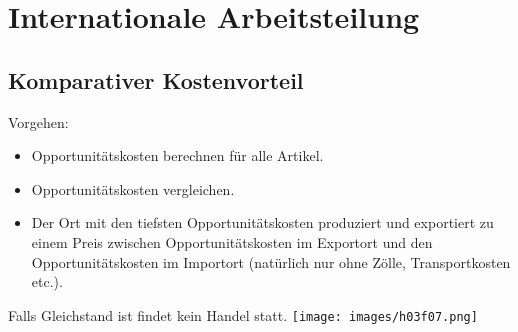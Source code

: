 \section{Internationale Arbeitsteilung}
\subsection{Komparativer Kostenvorteil}
\begin{multicols}{2}
	Vorgehen:
	\begin{itemize}
		\item Opportunitätskosten berechnen für alle Artikel.
		\item Opportunitätskosten vergleichen.
		\item Der Ort mit den tiefsten Opportunitätskosten produziert und
		exportiert zu einem Preis zwischen Opportunitätskosten im
		Exportort und den Opportunitätskosten im Importort (natürlich nur ohne
		Zölle, Transportkosten etc.).
	\end{itemize}
	Falls Gleichstand ist findet kein Handel statt.
	\texttt{[image: images/h03f07.png]}
\end{multicols}

